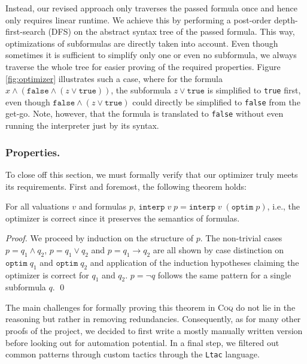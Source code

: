 Instead, our revised approach only traverses the passed formula once and hence only requires linear runtime.
We achieve this by performing a post-order depth-first-search (DFS) on the abstract syntax tree of the passed formula.
This way, optimizations of subformulas are directly taken into account.
Even though sometimes it is sufficient to simplify only one or even no subformula, we always traverse the whole tree for easier proving of the required properties.
Figure \ref{fig:optimizer} illustrates such a case, where for the formula $x \land (\texttt{false} \land (z \lor \texttt{true}))$, the subformula $z \lor \texttt{true}$ is simplified to \texttt{true} first, even though $\texttt{false} \land (z \lor \texttt{true})$ could directly be simplified to \texttt{false} from the get-go.
Note, however, that the formula is translated to \texttt{false} without even running the interpreter just by its syntax.

\subsubsection{Properties.}

To close off this section, we must formally verify that our optimizer truly meets its requirements.
First and foremost, the following theorem holds:
\begin{theorem}
    For all valuations $v$ and formulas $p$, $\texttt{interp}\;v\;p = \texttt{interp}\;v\;(\texttt{optim}\;p)$, i.e., the optimizer is correct since it preserves the semantics of formulas.
\end{theorem}
\begin{proof}
    We proceed by induction on the structure of $p$. 
    The non-trivial cases $p = q_1 \land q_2$, $p = q_1 \lor q_2$ and $p = q_1 \rightarrow q_2$ are all shown by case distinction on $\texttt{optim}\;q_1$ and $\texttt{optim}\;q_2$ and application of the induction hypotheses claiming the optimizer is correct for $q_1$ and $q_2$.
    $p = \neg q$ follows the same pattern for a single subformula $q$. \qed
\end{proof}
The main challenges for formally proving this theorem in \textsc{Coq} do not lie in the reasoning but rather in removing redundancies.
Consequently, as for many other proofs of the project, we decided to first write a mostly manually written version before looking out for automation potential.
In a final step, we filtered out common patterns through custom tactics through the \texttt{Ltac} language. 

